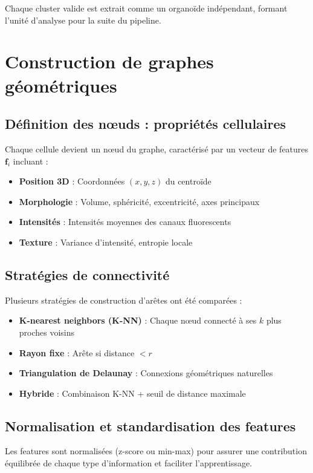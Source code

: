 Chaque cluster valide est extrait comme un organoïde indépendant, formant l'unité d'analyse pour la suite du pipeline.

\section{Construction de graphes géométriques}

\subsection{Définition des nœuds : propriétés cellulaires}

Chaque cellule devient un nœud du graphe, caractérisé par un vecteur de features $\mathbf{f}_i$ incluant :
\begin{itemize}
    \item \textbf{Position 3D} : Coordonnées $(x, y, z)$ du centroïde
    \item \textbf{Morphologie} : Volume, sphéricité, excentricité, axes principaux
    \item \textbf{Intensités} : Intensités moyennes des canaux fluorescents
    \item \textbf{Texture} : Variance d'intensité, entropie locale
\end{itemize}

\subsection{Stratégies de connectivité}

Plusieurs stratégies de construction d'arêtes ont été comparées :
\begin{itemize}
    \item \textbf{K-nearest neighbors (K-NN)} : Chaque nœud connecté à ses $k$ plus proches voisins
    \item \textbf{Rayon fixe} : Arête si distance $< r$
    \item \textbf{Triangulation de Delaunay} : Connexions géométriques naturelles
    \item \textbf{Hybride} : Combinaison K-NN + seuil de distance maximale
\end{itemize}

\subsection{Normalisation et standardisation des features}

Les features sont normalisées (z-score ou min-max) pour assurer une contribution équilibrée de chaque type d'information et faciliter l'apprentissage.

